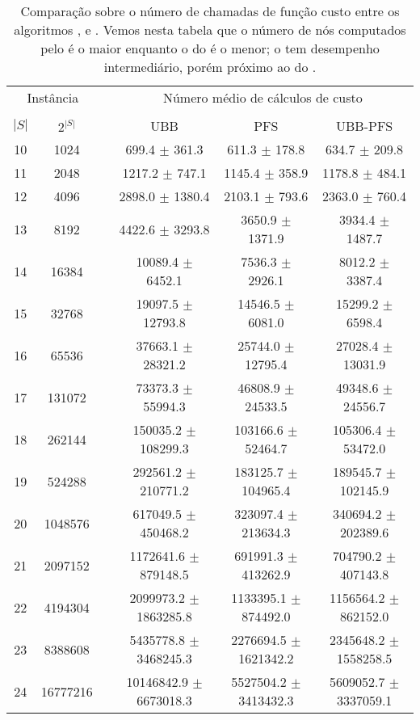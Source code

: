 \begin{table}
\centering
\footnotesize
\caption{Comparação sobre o número de chamadas de função custo entre
os algoritmos ,  e . Vemos
nesta tabela que o número de nós computados pelo  é o maior
enquanto o do  é o menor; o  tem 
desempenho intermediário, porém próximo ao do .}
\label{tab:ubbpfs_vs_ubb_vs_pfs_computed_nodes}
\begin{tabular}{cc c ccc}
\toprule
\multicolumn{2}{c}{Instância} & \phantom{} & \multicolumn{3}{c}{Número médio de cálculos de custo}\\
\cline{1-2}\cline{4-6} \\
$|S|$ & $2^{|S|}$ && UBB & PFS & UBB-PFS  \\
10 &    1024  && 699.4 $\pm$ 361.3 & 611.3 $\pm$ 178.8 & 634.7 $\pm$ 209.8 \\
11 &    2048  && 1217.2 $\pm$ 747.1 & 1145.4 $\pm$ 358.9 & 1178.8 $\pm$ 484.1 \\
12 &    4096  && 2898.0 $\pm$ 1380.4 & 2103.1 $\pm$ 793.6 & 2363.0 $\pm$ 760.4 \\
13 &    8192  && 4422.6 $\pm$ 3293.8 & 3650.9 $\pm$ 1371.9 & 3934.4 $\pm$ 1487.7 \\
14 &   16384  && 10089.4 $\pm$ 6452.1 & 7536.3 $\pm$ 2926.1 & 8012.2 $\pm$ 3387.4 \\
15 &   32768  && 19097.5 $\pm$ 12793.8 & 14546.5 $\pm$ 6081.0 & 15299.2 $\pm$ 6598.4 \\
16 &   65536  && 37663.1 $\pm$ 28321.2 & 25744.0 $\pm$ 12795.4 & 27028.4 $\pm$ 13031.9 \\
17 &  131072  && 73373.3 $\pm$ 55994.3 & 46808.9 $\pm$ 24533.5 & 49348.6 $\pm$ 24556.7 \\
18 &  262144  && 150035.2 $\pm$ 108299.3 & 103166.6 $\pm$ 52464.7 & 105306.4 $\pm$ 53472.0 \\
19 &  524288  && 292561.2 $\pm$ 210771.2 & 183125.7 $\pm$ 104965.4 & 189545.7 $\pm$ 102145.9 \\
20 & 1048576  && 617049.5 $\pm$ 450468.2 & 323097.4 $\pm$ 213634.3 & 340694.2 $\pm$ 202389.6 \\
21 & 2097152  && 1172641.6 $\pm$ 879148.5 & 691991.3 $\pm$ 413262.9 & 704790.2 $\pm$ 407143.8 \\
22 & 4194304  && 2099973.2 $\pm$ 1863285.8 & 1133395.1 $\pm$ 874492.0 & 1156564.2 $\pm$ 862152.0 \\
23 & 8388608  && 5435778.8 $\pm$ 3468245.3 & 2276694.5 $\pm$ 1621342.2 & 2345648.2 $\pm$ 1558258.5 \\
24 & 16777216 && 10146842.9 $\pm$ 6673018.3 & 5527504.2 $\pm$ 3413432.3 & 5609052.7 $\pm$ 3337059.1 \\
\bottomrule
\end{tabular}
\end{table}
